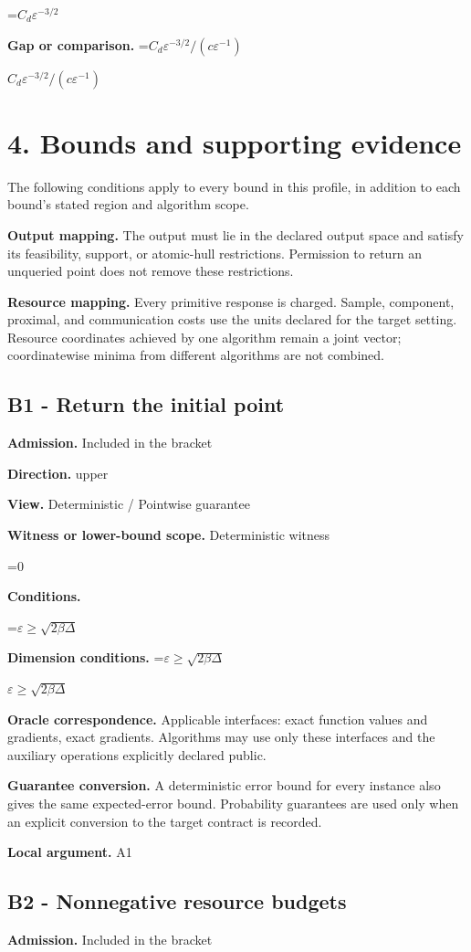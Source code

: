 \documentclass[10pt,a4paper]{article}
\newcommand{\AtlasMath}[1]{\par\begingroup\centering\setbox0=\hbox{$\displaystyle #1$}\ifdim\wd0>1.4\linewidth\typeout{ATLAS WIDE FORMULA: \the\wd0}\fi\ifdim\wd0>\linewidth\resizebox{\linewidth}{!}{\box0}\else\box0\fi\par\endgroup}
\newcommand{\AtlasInlineMath}[1]{\begingroup\setbox0=\hbox{$#1$}\ifdim\wd0>.4\linewidth\endgroup\AtlasMath{#1}\else\endgroup$#1$\fi}
\begin{document}
\AtlasMath{C_d\varepsilon^{-3/2}}
\textbf{Gap or comparison.} \AtlasInlineMath{C_d\varepsilon^{-3/2}/(c\varepsilon^{-1})}

\section{4. Bounds and supporting evidence}
The following conditions apply to every bound in this profile, in addition to each bound's stated region and algorithm scope.

\textbf{Output mapping.} The output must lie in the declared output space and satisfy its feasibility, support, or atomic-hull restrictions. Permission to return an unqueried point does not remove these restrictions.

\textbf{Resource mapping.} Every primitive response is charged. Sample, component, proximal, and communication costs use the units declared for the target setting. Resource coordinates achieved by one algorithm remain a joint vector; coordinatewise minima from different algorithms are not combined.

\subsection{B1 - Return the initial point}
\textbf{Admission.} Included in the bracket

\textbf{Direction.} upper

\textbf{View.} Deterministic / Pointwise guarantee

\textbf{Witness or lower-bound scope.} Deterministic witness

\AtlasMath{0}
\textbf{Conditions.} 
\AtlasMath{\varepsilon\ge\sqrt{2\beta\Delta}}


\textbf{Dimension conditions.} \AtlasInlineMath{\varepsilon\ge\sqrt{2\beta\Delta}}

\textbf{Oracle correspondence.} Applicable interfaces: exact function values and gradients, exact gradients. Algorithms may use only these interfaces and the auxiliary operations explicitly declared public.

\textbf{Guarantee conversion.} A deterministic error bound for every instance also gives the same expected-error bound. Probability guarantees are used only when an explicit conversion to the target contract is recorded.

\textbf{Local argument.} A1

\subsection{B2 - Nonnegative resource budgets}
\textbf{Admission.} Included in the bracket
\end{document}
